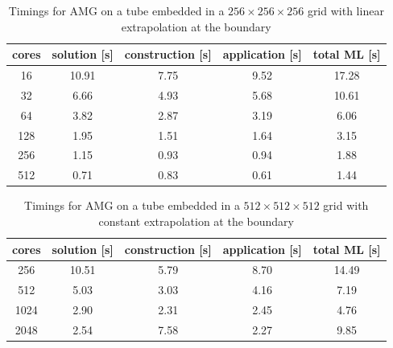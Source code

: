 \begin{table}[htb]
  \begin{center}
    \begin{tabular}{ccccc}
      \hline
      cores & solution [s] & construction [s] & application [s] & total ML [s] \\
      \hline
      16  & 10.91 &  7.75 &  9.52 & 17.28 \\
      32  &  6.66 &  4.93 &  5.68 & 10.61 \\
      64  &  3.82 &  2.87 &  3.19 &  6.06 \\
      128 &  1.95 &  1.51 &  1.64 &  3.15 \\
      256 &  1.15 &  0.93 &  0.94 &  1.88 \\
      512 &  0.71 &  0.83 &  0.61 &  1.44 \\
      \hline
    \end{tabular}
    \caption{Timings for AMG on a tube embedded in a $256\times256\times256$
      grid with linear extrapolation at the boundary}
    \label{tbl:timings_solver}
    \end{center}
\end{table}


\begin{table}[htb]
  \begin{center}
    \begin{tabular}{ccccc}
      \hline
      cores & solution [s] & construction [s] & application [s] & total ML [s] \\
      \hline
      256  &  10.51 &  5.79 &  8.70 &  14.49 \\
      512  &  5.03 &  3.03 &  4.16 &  7.19 \\
      1024 &  2.90 &  2.31 &  2.45 &  4.76 \\
      2048 &  2.54 &  7.58 &  2.27 &  9.85 \\
      \hline
    \end{tabular}
    \caption{Timings for AMG on a tube embedded in a $512\times512\times512$
      grid with constant extrapolation at the boundary}
    \label{tbl:timings_solver_512} 
  \end{center}
\end{table}


